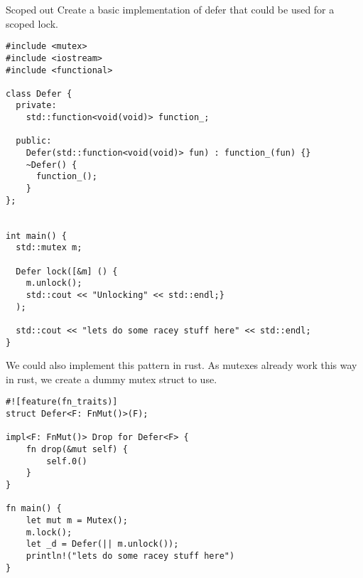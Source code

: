 \begin{examplebox}{Scoped out}
  Create a basic implementation of defer that could be used for a scoped lock.
  \tcblower
  \begin{verbatim}
#include <mutex>
#include <iostream>
#include <functional>

class Defer {
  private:
    std::function<void(void)> function_;

  public:
    Defer(std::function<void(void)> fun) : function_(fun) {}
    ~Defer() {
      function_();
    }
};


int main() {
  std::mutex m;

  Defer lock([&m] () {
    m.unlock();
    std::cout << "Unlocking" << std::endl;}
  );

  std::cout << "lets do some racey stuff here" << std::endl;
}
  \end{verbatim}
  We could also implement this pattern in rust. As mutexes already work this way in rust, we create a dummy mutex struct to use.
  \begin{verbatim}
#![feature(fn_traits)]
struct Defer<F: FnMut()>(F);

impl<F: FnMut()> Drop for Defer<F> {
    fn drop(&mut self) {
        self.0()
    }
}

fn main() {
    let mut m = Mutex();
    m.lock();
    let _d = Defer(|| m.unlock());
    println!("lets do some racey stuff here")
}
  \end{verbatim}
\end{examplebox}

